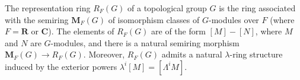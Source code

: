 The representation ring $R_F(G)$ of a topological group $G$ is the ring associated with the semiring $\mathbf{M}_F(G)$ of isomorphism classes of $G$-modules over $F$ (where $F = \mathbf{R}$ or $\mathbf{C}$). The elements of $R_F(G)$ are of the form $[M] - [N]$, where $M$ and $N$ are $G$-modules, and there is a natural semiring morphism $\mathbf{M}_F(G) \rightarrow R_F(G)$. Moreover, $R_F(G)$ admits a natural $\lambda$-ring structure induced by the exterior powers $\lambda^i[M] = [\Lambda^i M]$.
